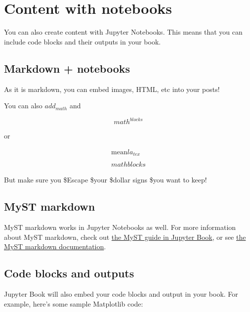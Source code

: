 \documentclass[
  letterpaper,
  DIV=11,
  numbers=noendperiod]{scrreprt}
\begin{document}
\hypertarget{content-with-notebooks}{%
\chapter{Content with notebooks}\label{content-with-notebooks}}

You can also create content with Jupyter Notebooks. This means that you
can include code blocks and their outputs in your book.

\hypertarget{markdown-notebooks}{%
\section{Markdown + notebooks}\label{markdown-notebooks}}

As it is markdown, you can embed images, HTML, etc into your posts!



You can also \(add_{math}\) and

\[
math^{blocks}
\]

or

\[
\begin{aligned}
\mbox{mean} la_{tex} \\ \\
math blocks
\end{aligned}
\]

But make sure you \$Escape \$your \$dollar signs \$you want to keep!

\hypertarget{myst-markdown}{%
\section{MyST markdown}\label{myst-markdown}}

MyST markdown works in Jupyter Notebooks as well. For more information
about MyST markdown, check out
\href{https://jupyterbook.org/content/myst.html}{the MyST guide in
Jupyter Book}, or see
\href{https://myst-parser.readthedocs.io/en/latest/}{the MyST markdown
documentation}.

\hypertarget{code-blocks-and-outputs}{%
\section{Code blocks and outputs}\label{code-blocks-and-outputs}}

Jupyter Book will also embed your code blocks and output in your book.
For example, here's some sample Matplotlib code:
\end{document}
